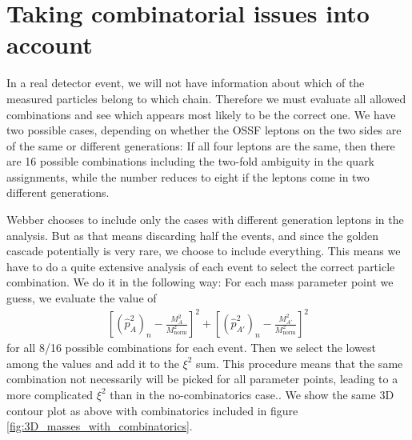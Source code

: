 \documentclass[twoside,english]{uiofysmaster}
\begin{document}



\section{Taking combinatorial issues into account}
In a real detector event, we will not have information about which of the measured particles belong to which chain. Therefore we must evaluate all allowed combinations and see which appears most likely to be the correct one. We have two possible cases, depending on whether the OSSF leptons on the two sides are of the same or different generations: If all four leptons are the same, then there are 16 possible combinations including the two-fold ambiguity in the quark assignments, while the number reduces to eight if the leptons come in two different generations. 

Webber chooses to include only the cases with different generation leptons in the analysis. But as that means discarding half the events, and since the golden cascade potentially is very rare, we choose to include everything. This means we have to do a quite extensive analysis of each event to select the correct particle combination. We do it in the following way: For each mass parameter point we guess, we evaluate the value of 
\begin{align}
 	\left[(\hat p_{A}^2)_n - \frac{M_A^2}{M_\mathrm{norm}^2}\right]^2 + \left[(\hat p_{A'}^2)_n - \frac{M_{A'}^2}{M_\mathrm{norm}^2}\right]^2
 \end{align} 
 for all 8/16 possible combinations for each event. Then we select the lowest among the values and add it to the $\xi^2$ sum. This procedure means that the same combination not necessarily will be picked for all parameter points, leading to a more complicated $\xi^2$ than in the no-combinatorics case.. We show the same 3D contour plot as above with combinatorics included in figure \ref{fig:3D_masses_with_combinatorics}.
\end{document}
